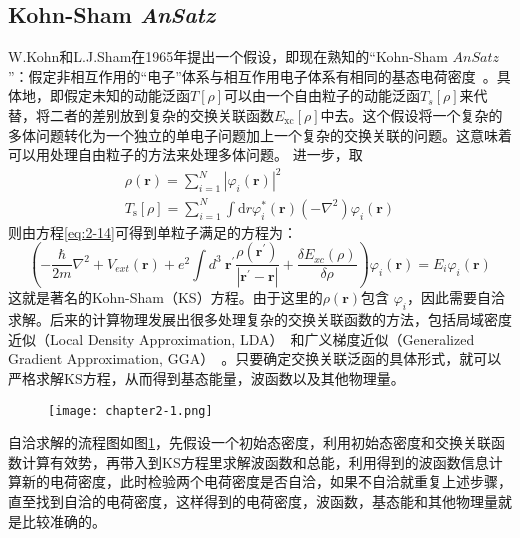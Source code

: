 \subsection{Kohn-Sham \it{AnSatz}}
W.Kohn和L.J.Sham在1965年提出一个假设，即现在熟知的“Kohn-Sham $\textit{AnSatz}$”：假定非相互作用的“电子”体系与相互作用电子体系有相同的基态电荷密度~\citep{Kohn-Sham,martin_2004}。具体地，即假定未知的动能泛函$T[\rho]$可以由一个自由粒子的动能泛函$T_s[\rho]$来代替，将二者的差别放到复杂的交换关联函数$E_{\mathrm{xc}}[\rho]$中去。这个假设将一个复杂的多体问题转化为一个独立的单电子问题加上一个复杂的交换关联的问题。这意味着可以用处理自由粒子的方法来处理多体问题。
进一步，取
\begin{equation}
    \label{eq:2-14}
    \begin{array}{c}
    \rho(\boldsymbol{r})=\sum\limits_{i=1}^{N}\left|\varphi_{i}(\boldsymbol{r})\right|^{2} \\
    T_{\mathrm{s}}[\rho]=\sum\limits _{i=1}^{N} \int \mathrm{d} r \varphi_{i}^{*}(\boldsymbol{r})\left(-\nabla^{2}\right) \varphi_{i}(\boldsymbol{r})
    \end{array}
\end{equation}
则由方程\ref{eq:2-14}可得到单粒子满足的方程为：
\begin{equation}
    \label{eq:2-15}
    \left(-\frac{\hbar}{2 m} \nabla^{2}+V_{e x t}(\mathbf{r})+e^{2} \int d^{3}\ \mathbf{r}^{\prime} \frac{\rho\left(\mathbf{r}^{\prime}\right)}{\left|\mathbf{r}^{\prime}-\mathbf{r}\right|}+\frac{\delta E_{x c}(\rho)}{\delta \rho}\right) \varphi_{i}(\mathbf{r})=E_{i} \varphi_{i}(\mathbf{r})
\end{equation}
这就是著名的Kohn-Sham（KS）方程。由于这里的$\rho(\boldsymbol{r})$包含
$ \varphi_{i}$，因此需要自洽求解。后来的计算物理发展出很多处理复杂的交换关联函数的方法，包括局域密度近似（Local Density Approximation, LDA）~\citep{lda1,lda2}和广义梯度近似（Generalized Gradient Approximation, GGA）~\citep{gga1,gga2,pbe}。只要确定交换关联泛函的具体形式，就可以严格求解KS方程，从而得到基态能量，波函数以及其他物理量。
\begin{figure}[!t]
    \centering
    \texttt{[image: chapter2-1.png]}
    \label{fig:2-1}
\end{figure}

自洽求解的流程图如图\ref{fig:2-1}，先假设一个初始态密度，利用初始态密度和交换关联函数计算有效势，再带入到KS方程里求解波函数和总能，利用得到的波函数信息计算新的电荷密度，此时检验两个电荷密度是否自洽，如果不自洽就重复上述步骤，直至找到自洽的电荷密度，这样得到的电荷密度，波函数，基态能和其他物理量就是比较准确的。
